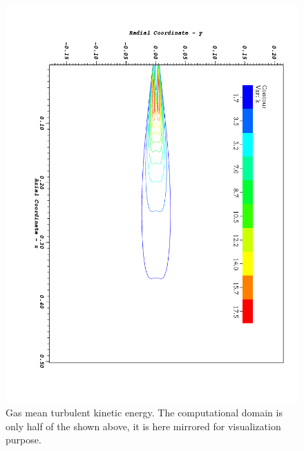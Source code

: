 \clearpage
\begin{figure}
\begin{center}
  \includegraphics[height=0.9\textheight]{./figuras/appA2/visit_k.png}
 \end{center}
 \caption{Gas mean turbulent kinetic energy. The computational domain is only half of the shown above, it is here mirrored for visualization purpose.}
 \label{fig: field_k}
\end{figure}

